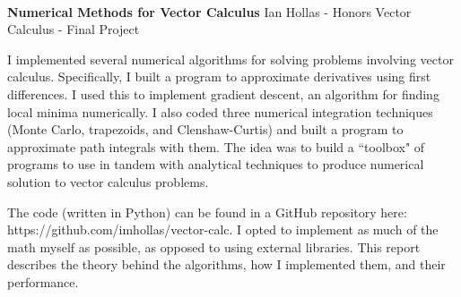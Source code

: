 \documentclass[11pt]{article}
\theoremstyle{plain}
\begin{document}
\thispagestyle{empty}
\bigskip \
\vspace{0.1cm}

\begin{center}
{\fontsize{20}{20} \selectfont \bf \sffamily Numerical Methods for Vector Calculus}
\vskip 14pt
{\fontsize{14}{14} \selectfont \rmfamily Ian Hollas - Honors Vector Calculus - Final Project} 
\vskip 6pt
\vskip 24pt
\end{center}

\large
I implemented several numerical algorithms for solving problems involving vector calculus. Specifically, I built a program to approximate derivatives using first differences. I used this to implement gradient descent, an algorithm for finding local minima numerically. I also coded three numerical integration techniques (Monte Carlo, trapezoids, and Clenshaw-Curtis) and built a program to approximate path integrals with them. The idea was to build a ``toolbox" of programs to use in tandem with analytical techniques to produce numerical solution to vector calculus problems.
\par
The code (written in Python) can be found in a GitHub repository here: \\ https://github.com/imhollas/vector-calc. I opted to implement as much of the math myself as possible, as opposed to using external libraries. This report describes the theory behind the algorithms, how I implemented them, and their performance.


\newpage
\microtoc
\newpage

\end{document}
